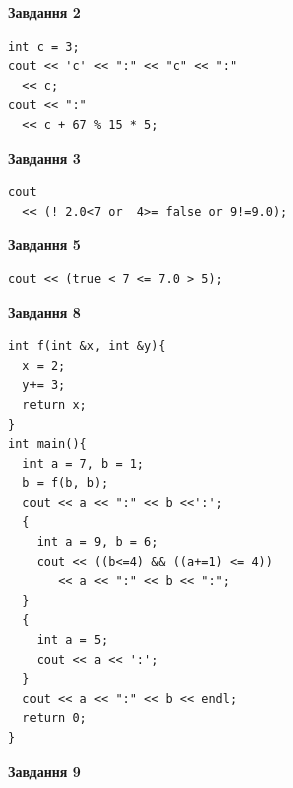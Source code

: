 \documentclass[12pt, ukrainian]{article}
\begin{document}
{\begin {large}
\begin{minipage}[t]{7.0cm}
\end{minipage}
\vline \hspace{1mm}
\begin{minipage}[t]{11.0cm}

\begin{center}
\textbf{Завдання 2}
\end{center}
\vspace{-8mm}

\begin{verbatim}
int c = 3;
cout << 'c' << ":" << "c" << ":" 
  << c;
cout << ":" 
  << c + 67 % 15 * 5;
\end{verbatim}



\begin{center}
\textbf{Завдання 3}
\end{center}
\vspace{-8mm}

\begin{verbatim}
cout 
  << (! 2.0<7 or  4>= false or 9!=9.0);
\end{verbatim}



\begin{center}
\textbf{Завдання 5}
\end{center}
\vspace{-8mm}

\begin{verbatim}
cout << (true < 7 <= 7.0 > 5);
\end{verbatim}



\begin{center}
\textbf{Завдання 8}
\end{center}
\vspace{-8mm}

\begin{verbatim}
int f(int &x, int &y){
  x = 2;
  y+= 3;
  return x;
}
int main(){
  int a = 7, b = 1;
  b = f(b, b);
  cout << a << ":" << b <<':';
  {
    int a = 9, b = 6;
    cout << ((b<=4) && ((a+=1) <= 4))
       << a << ":" << b << ":";
  }
  {
    int a = 5;
    cout << a << ':';
  }
  cout << a << ":" << b << endl;
  return 0;
}
\end{verbatim}

\end{minipage}


\begin{minipage}[t]{7.0cm}

\begin{center}
\textbf{Завдання 9}
\end{center}
\vspace{-8mm}


\end{minipage}
\end{large}}
\end{document}
